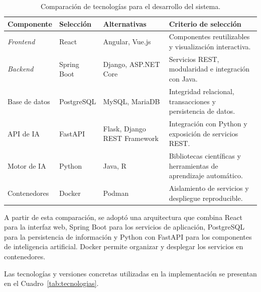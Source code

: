 \begin{table}[htbp]
\centering
\caption{Comparación de tecnologías para el desarrollo del sistema.}
\label{tab:comparacion_tecnologias}
\scriptsize
\setlength{\tabcolsep}{3pt}
\renewcommand{\arraystretch}{1.15}

\begin{tabular}{|
>{\raggedright\arraybackslash}p{2.1cm}|
>{\raggedright\arraybackslash}p{2.4cm}|
>{\raggedright\arraybackslash}p{2.8cm}|
>{\raggedright\arraybackslash}p{3.6cm}|}
\hline
\textbf{Componente} &
\textbf{Selección} &
\textbf{Alternativas} &
\textbf{Criterio de selección} \\
\hline

\textit{Frontend} &
React &
Angular, Vue.js &
Componentes reutilizables y visualización interactiva. \\
\hline

\textit{Backend} &
Spring Boot &
Django, ASP.NET Core &
Servicios REST, modularidad e integración con Java. \\
\hline

Base de datos &
PostgreSQL &
MySQL, MariaDB &
Integridad relacional, transacciones y persistencia de datos. \\
\hline

API de IA &
FastAPI &
Flask, Django REST Framework &
Integración con Python y exposición de servicios REST. \\
\hline

Motor de IA &
Python &
Java, R &
Bibliotecas científicas y herramientas de aprendizaje automático. \\
\hline

Contenedores &
Docker &
Podman &
Aislamiento de servicios y despliegue reproducible. \\
\hline

\end{tabular}
\end{table}

A partir de esta comparación, se adoptó una
arquitectura que combina React para la interfaz
web, Spring Boot para los servicios de aplicación,
PostgreSQL para la persistencia de información
y Python con FastAPI para los componentes de
inteligencia artificial. Docker permite organizar
y desplegar los servicios en contenedores.

Las tecnologías y versiones concretas utilizadas
en la implementación se presentan en el
Cuadro~\ref{tab:tecnologias}.

\begingroup
\small
\setlength{\tabcolsep}{3pt}
\renewcommand{\arraystretch}{1.08}
\setlength{\LTleft}{0pt}
\setlength{\LTright}{0pt}

